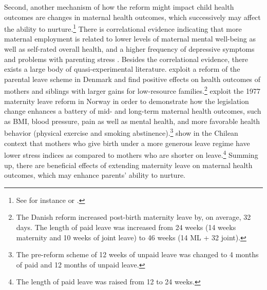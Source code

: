 \documentclass[11pt, a4paper]{article} %
\begin{document}
Second, another mechanism of how the reform might impact child health outcomes are
changes in maternal health outcomes, which successively may affect the ability to nurture.\footnote{See for instance \cite{patel2004} or \cite{frech2011maternal}.} There is correlational evidence indicating that more maternal employment is related to lower levels of maternal mental well-being as well as self-rated overall health, and a higher frequency of depressive symptoms and problems with parenting stress \citep{chatterji2005does,Chatterji2013}. Besides the correlational evidence, there exists a large body of quasi-experimental literature. \cite{beuchert2016} exploit a reform of the parental leave scheme in Denmark and find positive effects on health outcomes of mothers and siblings with larger gains for low-resource families.\footnote{The Danish reform increased post-birth maternity leave by, on average, 32 days. The length of paid leave was increased from 24 weeks (14 weeks maternity and 10 weeks of joint leave) to 46 weeks (14 ML + 32 joint).} \cite{butikofer2018impact} exploit the 1977 maternity leave reform in Norway in order to demonstrate how the legislation change enhances a battery of mid- and long-term maternal health outcomes, such as BMI, blood pressure, pain as well as mental health, and more favorable health behavior (physical exercise and smoking abstinence).\footnote{The pre-reform scheme of 12 weeks of unpaid leave was changed to 4 months of paid and 12 months of unpaid leave.} \cite{albagli2018} show in the Chilean context that mothers who give birth under a more generous leave regime have lower stress indices as compared to mothers who are shorter on leave.\footnote{The length of paid leave was raised from 12 to 24 weeks.} Summing up, there are beneficial effects of extending maternity leave on maternal health outcomes, which may enhance parents' ability to nurture.\newline 
\end{document}
